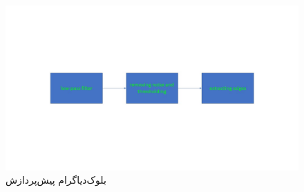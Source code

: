 \documentclass{article}
\begin{document}
\subsection{}
\begin{latin}

\end{latin}

\subsection{}
\begin{latin}

\end{latin}

\subsection{}
\begin{figure}[H]
    \centering
    \includegraphics[width=1.0\textwidth]{figures/1.jpg}
    \caption
	{
بلوک‌دیاگرام پیش‌پردازش
	}
    \label{fig:fig1}
\end{figure}

\newpage
\end{document}
